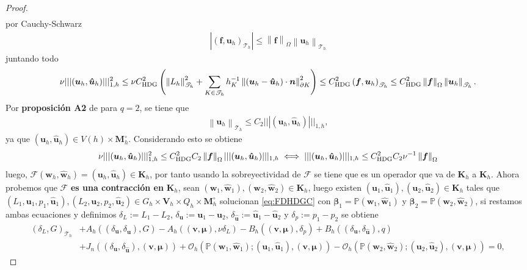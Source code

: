 \documentclass[10pt,a4paper]{report}
\newcommand{\bs}{\boldsymbol}
\newcommand{\Th}{\mathscr{T}_{h}}
\providecommand{\abs}[1]{\left\lvert#1\right\rvert}
\providecommand{\norm}[1]{\left\lVert#1\right\rVert}
\providecommand{\Pii}[2]{\left( #1,#2  \right)}
\begin{document}
\begin{proof}
\begin{align*}
    \end{align*}
    por Cauchy-Schwarz
    \begin{align*}
    	\abs{\Pii{\bs{f}}{\bs{u}_{h}}_{\Th}} \leq \norm{\bs{f}}_{\Omega}\norm{\bs{u}_{h}}_{\Th}
    \end{align*}
    juntando todo
     \begin{align*}
    	\nu ||| (\bs{u}_{h},\bs{\hat{u}}_{h}) |||^{2}_{1,h}\leq \nu C^{2}_{\textup{HDG}}\left(
    	\norm{L_{h}}^{2}_{\Th} + \sum_{K\in\Th}h^{-1}_{K}\norm{(\bs{u}_{h}-\bs{\hat{u}}_{h})\cdot\bs{n}}^{2}_{\partial K}  \right)\leq  C^{2}_{\textup{HDG}}\Pii{\bs{f}}{\bs{u}_{h}}_{\Th}\leq  C^{2}_{\textup{HDG}}\norm{\bs{f}}_{\Omega}\norm{\bs{u}_{h}}_{\Th}.
    \end{align*}
    Por \textbf{proposición A2} de \cite{CAC2017} para $q = 2$, se tiene que 
    \begin{align*}
    	\norm{\bs{u}_{h}}_{\Th} \leq C_{2}|||(\bs{u}_{h},\bs{\hat{u}}_{h}) |||_{1,h},
    \end{align*}
    ya que $(\bs{u}_{h},\bs{\hat{u}}_{h})\in V(h)\times\bs{M}^{\circ}_{h}$. Considerando esto se obtiene
    \begin{align*}
    	\nu ||| (\bs{u}_{h},\bs{\hat{u}}_{h}) |||^{2}_{1,h}\leq C^{2}_{\textup{HDG}}C_{2}\norm{\bs{f}}_{\Omega}|||(\bs{u}_{h},\bs{\hat{u}}_{h}) |||_{1,h} \iff ||| (\bs{u}_{h},\bs{\hat{u}}_{h}) |||_{1,h}\leq C^{2}_{\textup{HDG}}C_{2}\nu^{-1}\norm{\bs{f}}_{\Omega}
    \end{align*}
    luego, $\mathcal{F}(\bs{w}_{h},\hat{\bs{w}}_{h}) = (\bs{u}_{h},\bs{\hat{u}}_{h})\in \bs{K}_{h}$, por tanto usando la sobreyectividad de $\mathcal{F}$ se tiene que es un operador que va de $\bs{K}_{h}$ a $\bs{K}_{h}$. Ahora probemos que $\bs{\mathcal{F}}$ \textbf{es una contracción en} $\bs{K}_{h}$, sean $(\bs{w}_{1},\bs{\hat{w}}_{1}),(\bs{w}_{2},\bs{\hat{w}}_{2})\in \bs{K}_{h}$, luego existen $(\bs{u}_{1},\bs{\hat{u}}_{1}),(\bs{u}_{2},\bs{\hat{u}}_{2})\in \bs{K}_{h}$ tales que $(L_{1},\bs{u}_{1},p_{1},\bs{\hat{u}}_{1}),(L_{2},\bs{u}_{2},p_{2},\bs{\hat{u}}_{2})\in G_{h}\times\bs{V}_{h}\times Q_{h}\times \bs{M}^{\circ}_{h}$ solucionan \ref{eq:FDHDGC} con $\bs{\beta}_{1} = \mathbb{P}(\bs{w}_{1},\hat{\bs{w}}_{1})$ y $\bs{\beta}_{2} = \mathbb{P}(\bs{w}_{2},\hat{\bs{w}}_{2})$, si restamos ambas ecuaciones y definimos $\delta_{L} := L_{1} - L_{2}$, $\delta_{\bs{u}} := \bs{u}_{1} - \bs{u}_{2}$, $\delta_{\bs{\hat{u}}} := \bs{\hat{u}}_{1} - \bs{\hat{u}}_{2}$ y $\delta_{p} := p_{1} - p_{2}$ se obtiene
    \begin{align*}
    	\Pii{\delta_{L}}{G}_{\Th} &+ A_{h}\left((\delta_{\bs{u}},\delta_{\bs{\hat{u}}}),G\right) - A_{h}\left((\bs{v},\bs{\mu}),\nu\delta_{L}\right) - B_{h}\left((\bs{v},\bs{\mu}),\delta_{p}\right) + B_{h}\left((\delta_{\bs{u}},\delta_{\bs{\hat{u}}}),q\right)\\ &+ J_{n}\left((\delta_{\bs{u}},\delta_{\bs{\hat{u}}}),(\bs{v}, \bs{\mu})\right) + \mathcal{O}_{h}\left(\mathbb{P}(\bs{w}_{1},\bs{\hat{w}}_{1});(\bs{u}_{1},\bs{\hat{\bs{u}}}_{1}),(\bs{v},\bs{\mu})\right) - \mathcal{O}_{h}\left(\mathbb{P}(\bs{w}_{2},\bs{\hat{w}}_{2});(\bs{u}_{2},\bs{\hat{\bs{u}}}_{2}),(\bs{v},\bs{\mu})\right) = 0,

\end{align*}
\end{proof}
\end{document}

